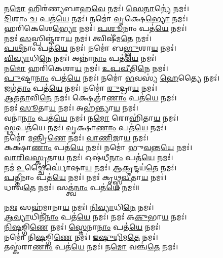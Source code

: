 𑌨\ul{𑌮𑍋} 𑌹𑌿𑌰॑𑌣𑍍𑌯𑌬𑌾𑌹\ul{𑌵𑍇} 𑌨𑌮𑌃॑। \ul{𑌸𑍇}\ul{𑌨𑌾}𑌨𑍍𑌯𑍇॑  𑌨𑌮𑌃॑। \\
\ul{𑌦𑌿}𑌶𑌾𑌂 \ul{𑌚} 𑌪𑌤॑\ul{𑌯𑍇} 𑌨𑌮𑌃॑। 𑌨𑌮𑍋॑ \ul{𑌵𑍃}𑌕𑍍𑌷𑍇\ul{𑌭𑍍𑌯𑍋} 𑌨𑌮𑌃॑। \\
𑌹𑌰𑌿॑𑌕𑍇𑌶𑍇\ul{𑌭𑍍𑌯𑍋}  𑌨𑌮𑌃॑। \ul{𑌪}\ul{𑌶𑍂}𑌨𑌾𑌂 𑌪𑌤॑\ul{𑌯𑍇}  𑌨𑌮𑌃॑। \\
𑌨𑌮𑌃॑ \ul{𑌸}𑌸𑍍𑌪𑌿𑌞𑍍𑌜॑𑌰𑌾\ul{𑌯} 𑌨𑌮𑌃॑। 𑌤𑍍𑌵𑌿𑌷𑍀॑𑌮\ul{𑌤𑍇} 𑌨𑌮𑌃॑। \\
\ul{𑌪}\ul{𑌥𑍀}𑌨𑌾𑌂 𑌪𑌤॑\ul{𑌯𑍇} 𑌨𑌮𑌃॑। 𑌨𑌮𑍋॑ 𑌬\ul{𑌭𑍍𑌲𑍁}𑌶𑌾\ul{𑌯} 𑌨𑌮𑌃॑। \\
\ul{𑌵𑌿}\ul{𑌵𑍍𑌯𑌾}𑌧𑌿\ul{𑌨𑍇} 𑌨𑌮𑌃॑। 𑌅𑌨𑍍𑌨𑌾॑\ul{𑌨𑌾𑌂} 𑌪𑌤॑\ul{𑌯𑍇} 𑌨𑌮𑌃॑।  \\
𑌨\ul{𑌮𑍋} 𑌹𑌰𑌿॑𑌕𑍇𑌶𑌾\ul{𑌯} 𑌨𑌮𑌃॑। \ul{𑌉}\ul{𑌪}\ul{𑌵𑍀}𑌤𑌿\ul{𑌨𑍇} 𑌨𑌮𑌃॑। \\
\ul{𑌪𑍁}𑌷𑍍𑌟𑌾\ul{𑌨𑌾𑌂} 𑌪𑌤॑\ul{𑌯𑍇} 𑌨𑌮𑌃॑। 𑌨𑌮𑍋॑ \ul{𑌭}𑌵𑌸𑍍𑌯॑ \ul{𑌹𑍇}𑌤𑍍𑌯𑍈 𑌨𑌮𑌃॑। \\
𑌜𑌗॑\ul{𑌤𑌾𑌂} 𑌪𑌤॑\ul{𑌯𑍇} 𑌨𑌮𑌃॑। 𑌨𑌮𑍋॑ \ul{𑌰𑍁}𑌦𑍍𑌰𑌾\ul{𑌯} 𑌨𑌮𑌃॑। \\
\ul{𑌆}\ul{𑌤}\ul{𑌤𑌾}𑌵𑌿\ul{𑌨𑍇} 𑌨𑌮𑌃॑। 𑌕𑍍𑌷𑍇𑌤𑍍𑌰𑌾॑\ul{𑌣𑌾𑌂} 𑌪𑌤॑\ul{𑌯𑍇} 𑌨𑌮𑌃॑।  \\
𑌨𑌮𑌃॑ \ul{𑌸𑍂}𑌤𑌾\ul{𑌯} 𑌨𑌮𑌃॑। 𑌅𑌹॑𑌨𑍍𑌤𑍍𑌯𑌾\ul{𑌯} 𑌨𑌮𑌃॑। \\
𑌵𑌨𑌾॑\ul{𑌨𑌾𑌂}  𑌪𑌤॑\ul{𑌯𑍇} 𑌨𑌮𑌃॑। 𑌨\ul{𑌮𑍋} 𑌰𑍋𑌹𑌿॑𑌤𑌾\ul{𑌯} 𑌨𑌮𑌃॑। \\
\ul{𑌸𑍍𑌥}𑌪𑌤॑𑌯𑍇 𑌨𑌮𑌃॑। \ul{𑌵𑍃}𑌕𑍍𑌷𑌾\ul{𑌣𑌾𑌂} 𑌪𑌤॑\ul{𑌯𑍇} 𑌨𑌮𑌃॑। \\
𑌨𑌮𑍋॑ \ul{𑌮}𑌨𑍍𑌤𑍍𑌰𑌿\ul{𑌣𑍇} 𑌨𑌮𑌃॑। \ul{𑌵𑌾}\ul{𑌣𑌿}𑌜𑌾\ul{𑌯} 𑌨𑌮𑌃॑। \\
𑌕𑌕𑍍𑌷𑌾॑\ul{𑌣𑌾𑌂} 𑌪𑌤॑\ul{𑌯𑍇} 𑌨𑌮𑌃॑। 𑌨𑌮𑍋॑ 𑌭𑍁\ul{𑌵}𑌨𑍍𑌤\ul{𑌯𑍇} 𑌨𑌮𑌃॑। \\
\ul{𑌵𑌾}\ul{𑌰𑌿}\ul{𑌵}\ul{𑌸𑍍𑌕𑍃}𑌤𑌾\ul{𑌯} 𑌨𑌮𑌃॑। 𑌓𑌷॑𑌧𑍀\ul{𑌨𑌾𑌂} 𑌪𑌤॑\ul{𑌯𑍇} 𑌨𑌮𑌃॑। \\
𑌨𑌮॑ \ul{𑌉}𑌚𑍍𑌚𑍈𑌰𑍍𑌘𑍋॑𑌷𑌾\ul{𑌯} 𑌨𑌮𑌃॑। \ul{𑌆}\ul{𑌕𑍍𑌰}𑌨𑍍𑌦𑌯॑\ul{𑌤𑍇} 𑌨𑌮𑌃॑। \\
\ul{𑌪}\ul{𑌤𑍍𑌤𑍀}𑌨𑌾𑌂 𑌪𑌤॑\ul{𑌯𑍇} 𑌨𑌮𑌃॑। 𑌨𑌮𑌃॑ 𑌕𑍃𑌥𑍍𑌸𑍍𑌨\ul{𑌵𑍀}𑌤𑌾\ul{𑌯} 𑌨𑌮𑌃॑। \\
𑌧𑌾𑌵॑\ul{𑌤𑍇} 𑌨𑌮𑌃॑। 𑌸𑌤𑍍𑌤𑍍𑌵॑\ul{𑌨𑌾𑌂} 𑌪𑌤॑\ul{𑌯𑍇} 𑌨𑌮𑌃॑॥\\
\\
𑌨\ul{𑌮𑌃} 𑌸𑌹॑𑌮𑌾𑌨𑌾\ul{𑌯} 𑌨𑌮𑌃॑। \ul{𑌨𑌿}\ul{𑌵𑍍𑌯𑌾}𑌧𑌿\ul{𑌨𑍇} 𑌨𑌮𑌃॑। \\
\ul{𑌆}\ul{𑌵𑍍𑌯𑌾}𑌧𑌿𑌨𑍀॑\ul{𑌨𑌾𑌂} 𑌪𑌤॑\ul{𑌯𑍇} 𑌨𑌮𑌃॑। 𑌨𑌮𑌃॑ 𑌕\ul{𑌕𑍁}𑌭𑌾\ul{𑌯} 𑌨𑌮𑌃॑। \\
\ul{𑌨𑌿}\ul{𑌷}𑌙𑍍𑌗𑌿\ul{𑌣𑍇} 𑌨𑌮𑌃॑। \ul{𑌸𑍍𑌤𑍇}𑌨𑌾\ul{𑌨𑌾𑌂} 𑌪𑌤॑\ul{𑌯𑍇} 𑌨𑌮𑌃॑। \\
𑌨𑌮𑍋॑ 𑌨𑌿\ul{𑌷}𑌙𑍍𑌗𑌿\ul{𑌣𑍇} 𑌨𑌮𑌃॑। \ul{𑌇}\ul{𑌷𑍁}\ul{𑌧𑌿}𑌮\ul{𑌤𑍇} 𑌨𑌮𑌃॑। \\
𑌤𑌸𑍍𑌕॑𑌰𑌾\ul{𑌣𑌾𑌂} 𑌪𑌤॑\ul{𑌯𑍇} 𑌨𑌮𑌃॑। 𑌨\ul{𑌮𑍋} 𑌵𑌞𑍍𑌚॑\ul{𑌤𑍇} 𑌨𑌮𑌃॑। \\
